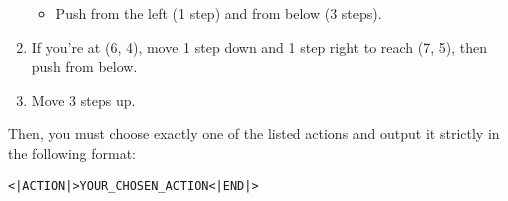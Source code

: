 \begin{GreenBox}
\begin{enumerate}
\begin{itemize}
				\item Push from the left (1 step) and from below (3 steps).
			\end{itemize}

		\item If you're at (6, 4), move 1 step down and 1 step right to reach (7, 5),
			then push from below.

		\item Move 3 steps up.
	\end{enumerate}

	Then, you must choose exactly one of the listed actions and output it strictly
	in the following format:

	\texttt{<|ACTION|>YOUR\_CHOSEN\_ACTION<|END|>}
\end{GreenBox}